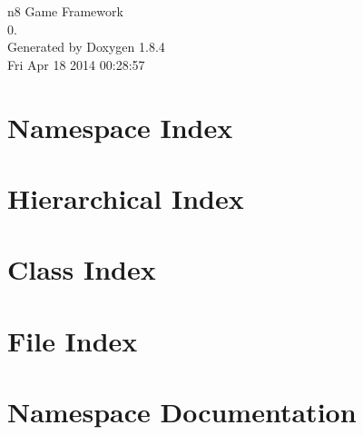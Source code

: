 \documentclass[twoside]{book}
\newcommand{\clearemptydoublepage}{%
  \newpage{\pagestyle{empty}\cleardoublepage}%
}
\begin{document}
\hypersetup{pageanchor=false}
\begin{titlepage}
\vspace*{7cm}
\begin{center}%
{\Large n8 Game Framework \\[1ex]\large 0. }\\
\vspace*{1cm}
{\large Generated by Doxygen 1.8.4}\\
\vspace*{0.5cm}
{\small Fri Apr 18 2014 00:28:57}\\
\end{center}
\end{titlepage}
\clearemptydoublepage
\tableofcontents
\clearemptydoublepage
{}
\hypersetup{pageanchor=true}

\chapter{Namespace Index}

\chapter{Hierarchical Index}

\chapter{Class Index}

\chapter{File Index}

\chapter{Namespace Documentation}






\end{document}
